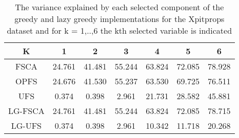 \begin{table}
	\begin{center}
		\begin{tabular}{c c c c c c c}
			K & 1 & 2 & 3 & 4 & 5 & 6 \\
			\hline
			FSCA & 24.761 & 41.481 & 55.244 & 63.824 & 72.085 & 78.928 \\
			OPFS & 24.676 & 41.530 & 55.237 & 63.530 & 69.725 & 76.511 \\
			UFS & 0.374 & 0.398 & 2.961 & 21.731 & 28.582 & 45.881 \\
			LG-FSCA & 24.761 & 41.481 & 55.244 & 63.824 & 72.085 & 78.715 \\
			LG-UFS & 0.374 & 0.398 & 2.961 & 10.342 & 11.718 & 20.268 \\
		\end{tabular}
	\end{center}
	\caption{The variance explained by each selected component of the greedy and lazy greedy implementations for the Xpitprops dataset and for k = 1,..,6 the kth selected variable is indicated}
\end{table}